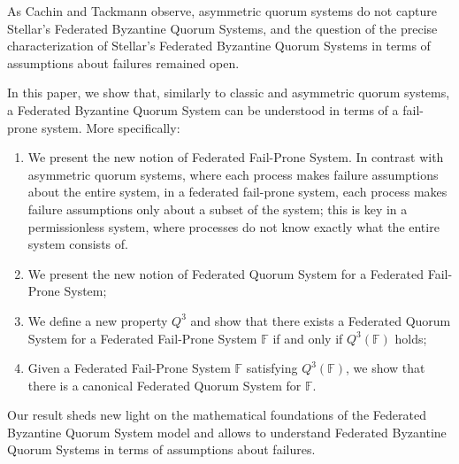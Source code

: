 \documentclass[11pt]{article}
\begin{document}
As Cachin and Tackmann observe, asymmetric quorum systems do not capture Stellar's Federated Byzantine Quorum Systems, and the question of the precise characterization of Stellar's Federated Byzantine Quorum Systems in terms of assumptions about failures remained open.

In this paper, we show that, similarly to classic and asymmetric quorum systems, a Federated Byzantine Quorum System can be understood in terms of a fail-prone system. More specifically:
\begin{enumerate}
  \item We present the new notion of Federated Fail-Prone System. In contrast with asymmetric quorum systems, where each process makes failure assumptions about the entire system, in a federated fail-prone system, each process makes failure assumptions only about a subset of the system; this is key in a permissionless system, where processes do not know exactly what the entire system consists of.
  \item We present the new notion of Federated Quorum System for a Federated Fail-Prone System;
  \item We define a new property $Q^3$ and show that there exists a Federated Quorum System for a Federated Fail-Prone System $\mathbb{F}$ if and only if $Q^3(\mathbb{F})$ holds;
  \item Given a Federated Fail-Prone System $\mathbb{F}$ satisfying $Q^3(\mathbb{F})$, we show that there is a canonical Federated Quorum System for $\mathbb{F}$.
\end{enumerate}

Our result sheds new light on the mathematical foundations of the Federated Byzantine Quorum System model and allows to understand Federated Byzantine Quorum Systems in terms of assumptions about failures.



\end{document}
